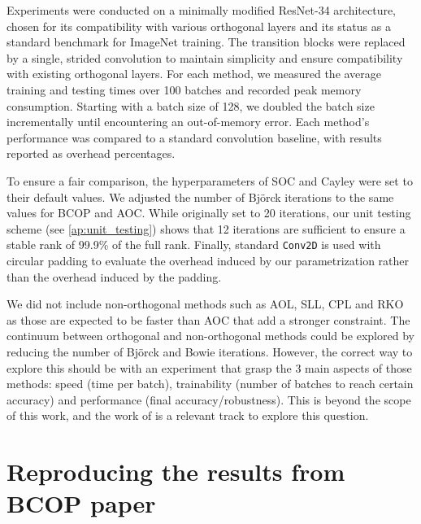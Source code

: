     Experiments were conducted on a minimally modified ResNet-34 architecture, chosen for its compatibility with various orthogonal layers and its status as a standard benchmark for ImageNet training. The transition blocks were replaced by a single, strided convolution to maintain simplicity and ensure compatibility with existing orthogonal layers. For each method, we measured the average training and testing times over 100 batches and recorded peak memory consumption. Starting with a batch size of 128, we doubled the batch size incrementally until encountering an out-of-memory error. Each method’s performance was compared to a standard convolution baseline, with results reported as overhead percentages.

    To ensure a fair comparison, the hyperparameters of SOC and Cayley were set to their default values. We adjusted the number of Björck iterations to the same values for BCOP and AOC. While originally set to 20 iterations, our unit testing scheme (see  \cref{ap:unit_testing}) shows that 12 iterations are sufficient to ensure a stable rank \cite{sanyalstable} of 99.9\% of the full rank. Finally, standard \texttt{Conv2D} is used with circular padding to evaluate the overhead induced by our parametrization rather than the overhead induced by the padding.

    We did not include non-orthogonal methods such as AOL, SLL, CPL and RKO \cite{prach_1-lipschitz_2023, araujo_unified_2023, meunier_dynamical_2022, serrurier_achieving_2021} as those are expected to be faster than AOC that add a stronger constraint. The continuum between orthogonal and non-orthogonal methods could be explored by reducing the number of Björck and Bowie iterations. However, the correct way to explore this should be with an experiment that grasp the 3 main aspects of those methods: speed (time per batch), trainability (number of batches to reach certain accuracy) and performance (final accuracy/robustness). This is beyond the scope of this work, and the work of \cite{prach_1-lipschitz_2023} is a relevant track to explore this question. %


\section{Reproducing the results from BCOP paper}\label{ap:repoducing_bcop}
    
